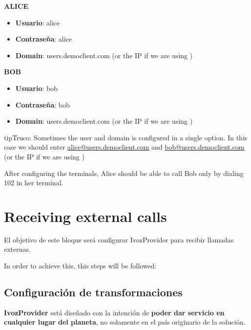 \documentclass[letterpaper,10pt,spanish]{sphinxmanual}
\begin{document}
\textbf{ALICE}
\begin{itemize}
\item {} 
\textbf{Usuario}: alice

\item {} 
\textbf{Contraseña}: alice

\item {} 
\textbf{Domain}: users.democlient.com (or the IP if we are using {\hyperref[getting_started/internal_calls/brand_portal:dnshack]{}})

\end{itemize}

\textbf{BOB}
\begin{itemize}
\item {} 
\textbf{Usuario}: bob

\item {} 
\textbf{Contraseña}: bob

\item {} 
\textbf{Domain}: users.democlient.com (or the IP if we are using {\hyperref[getting_started/internal_calls/brand_portal:dnshack]{}})

\end{itemize}

\begin{notice}{tip}{Truco:}
Sometimes the user and domain is configured in a single option. In this
case we should enter \href{mailto:alice@users.democlient.com}{alice@users.democlient.com} and \href{mailto:bob@users.democlient.com}{bob@users.democlient.com}
(or the IP if we are using {\hyperref[getting_started/internal_calls/brand_portal:dnshack]{}})
\end{notice}

After configuring the terminals, Alice should be able to call Bob only by
dialing 102 in her terminal.


\chapter{Receiving external calls}
\label{getting_started/external_incoming_calls/index::doc}\label{getting_started/external_incoming_calls/index:receiving-external-calls}
El objetivo de este bloque será configurar IvozProvider para recibir llamadas externas.

In order to achieve this, this steps will be followed:


\section{Configuración de transformaciones}
\label{getting_started/external_incoming_calls/transformations:transformations-configuration}\label{getting_started/external_incoming_calls/transformations::doc}
\textbf{IvozProvider} está diseñado con la intención de \textbf{poder dar servicio en cualquier lugar del planeta}, no solamente en el país originario de la solución.
\end{document}

